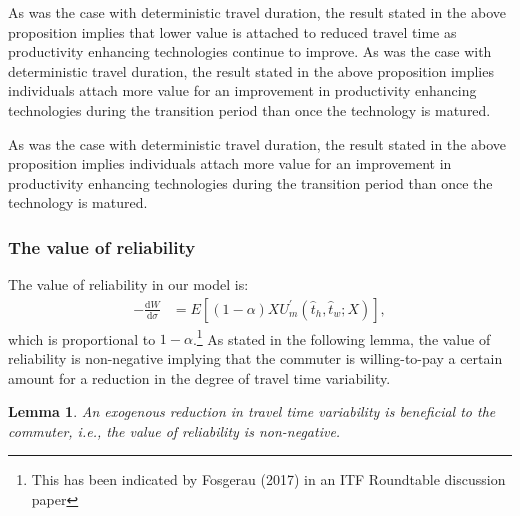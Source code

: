 \documentclass[12pt,a4paper,british]{article}
\newtheorem{lemma}{Lemma}[section]
\begin{document}
As was the case with deterministic travel duration, the result stated in the above proposition implies that lower value is  attached to reduced travel time as productivity enhancing technologies continue to improve. As was the case with deterministic travel duration, the result stated in the above proposition implies individuals attach more value for an improvement in productivity enhancing technologies during the transition period than once the technology is matured.  

As was the case with deterministic travel duration, the result stated in the above proposition implies individuals attach more value for an improvement in productivity enhancing technologies during the transition period than once the technology is matured.  


\subsubsection*{The value of reliability}

The value of reliability in our model is:
\begin{align*}
-\frac{\mathrm{d}W}{\mathrm{d}\sigma} & = E\left[\left( 1 - \alpha \right) X U_{m}^{\prime} \left(\hat{t}_{h}, \hat{t}_{w}; X\right)\right],
\end{align*} %
which is proportional to $1-\alpha$.\footnote{This has been indicated by {\color{blue}Fosgerau (2017)} in an ITF Roundtable discussion paper} As stated in the following lemma, the value of reliability is non-negative implying that the commuter is willing-to-pay a certain amount for a reduction in the degree of travel time variability.

\begin{lemma}
An exogenous reduction in travel time variability is beneficial to the commuter, i.e., the value of reliability is non-negative.
\end{lemma}
\end{document}
